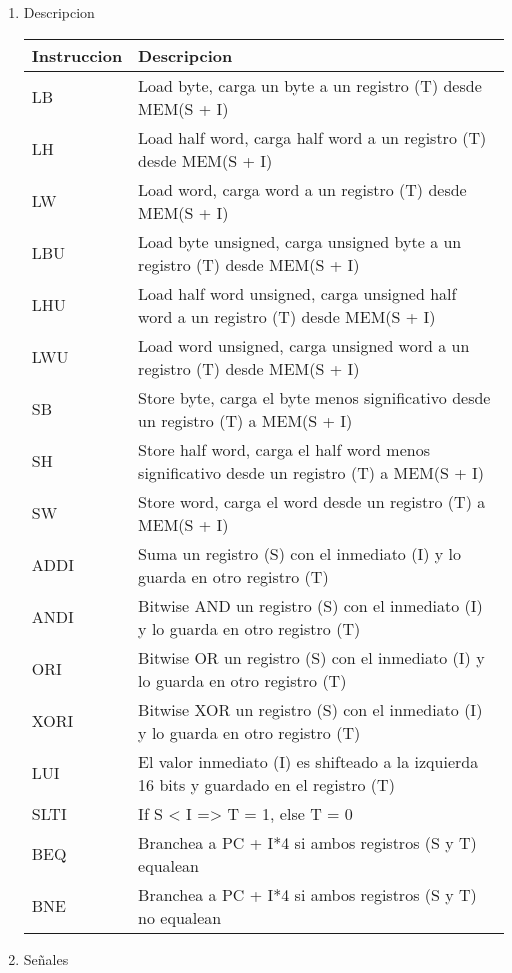 \documentclass[11pt]{article}
\begin{document}
\begin{enumerate}
\item Descripcion
\label{sec:org222d39f}

\begin{center}
\begin{tabular}{ll}
Instruccion & Descripcion\\
\hline
LB & Load byte, carga un byte a un registro (T) desde MEM(S + I)\\
LH & Load half word, carga half word a un registro (T) desde MEM(S + I)\\
LW & Load word, carga word a un registro (T) desde MEM(S + I)\\
LBU & Load byte unsigned, carga unsigned byte a un registro (T) desde MEM(S + I)\\
LHU & Load half word unsigned, carga unsigned half word a un registro (T) desde MEM(S + I)\\
LWU & Load word unsigned, carga unsigned word a un registro (T) desde MEM(S + I)\\
SB & Store byte, carga el byte menos significativo desde un registro (T) a MEM(S + I)\\
SH & Store half word, carga el half word menos significativo desde un registro (T) a MEM(S + I)\\
SW & Store word, carga el word desde un registro (T) a MEM(S + I)\\
ADDI & Suma un registro (S) con el inmediato (I) y lo guarda en otro registro (T)\\
ANDI & Bitwise AND un registro (S) con el inmediato (I) y lo guarda en otro registro (T)\\
ORI & Bitwise OR un registro (S) con el inmediato (I) y lo guarda en otro registro (T)\\
XORI & Bitwise XOR un registro (S) con el inmediato (I) y lo guarda en otro registro (T)\\
LUI & El valor inmediato (I) es shifteado a la izquierda 16 bits y guardado en el registro (T)\\
SLTI & If S < I => T = 1, else T = 0\\
BEQ & Branchea a PC + I*4 si ambos registros (S y T) equalean\\
BNE & Branchea a PC + I*4 si ambos registros (S y T) no equalean\\
\end{tabular}
\end{center}

\item Señales
\label{sec:org92c7d11}


\end{enumerate}
\end{document}
